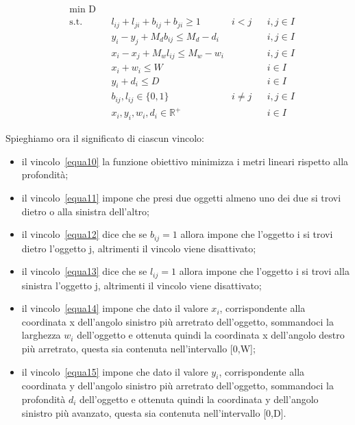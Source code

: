 \begin{align}
	& \underset{}{\text{min D}} \label{equa10}\\
	  & \text{s.t.} &   & l_{ij} + l_{ji} + b_{ij} + b_{ji} \geq 1      & i < j    &   & i,j \in I \label{equa11} \\
	  &             &   & y_i - y_j + M_d b_{ij} \leq M_d - d_i         &          &   & i,j \in I \label{equa12} \\
	  &             &   & x_i - x_j + M_w l_{ij} \leq M_w - w_i         &          &   & i,j \in I \label{equa13} \\
	  &             &   & x_i + w_i \leq W                              &          &   & i \in I   \label{equa14} \\
	  &             &   & y_i + d_i \leq D                              &          &   & i \in I   \label{equa15} \\
	  &             &   & b_{ij}, l_{ij} \in \{0,1\}                    & i \neq j &   & i,j \in I \label{equa16} \\
	  &             &   & x_{i}, y_{i}, w_{i}, d_{i} \in \mathbb{R}^{+} &          &   & i \in I  \label{equa17}  
\end{align}

Spieghiamo ora il significato di ciascun vincolo:
\begin{itemize}
	\item il vincolo~\eqref{equa10} la funzione obiettivo minimizza i metri lineari rispetto alla profondità;
	\item il vincolo~\eqref{equa11} impone che presi due oggetti almeno uno dei due si trovi dietro o alla sinistra dell'altro;
	\item il vincolo~\eqref{equa12} dice che se $b_{ij} = 1$ allora impone che l'oggetto i si trovi dietro l'oggetto j, altrimenti il vincolo viene disattivato;
	\item il vincolo~\eqref{equa13} dice che se $l_{ij} = 1$ allora impone che l'oggetto i si trovi alla sinistra l'oggetto j, altrimenti il vincolo viene disattivato;
	\item il vincolo~\eqref{equa14} impone che dato il valore $x_i$, corrispondente alla coordinata x dell'angolo sinistro più arretrato dell'oggetto, sommandoci la larghezza $w_i$ dell'oggetto e ottenuta quindi la coordinata x dell'angolo destro più arretrato, questa sia contenuta nell'intervallo [0,W];
	\item il vincolo~\eqref{equa15} impone che dato il valore $y_i$, corrispondente alla coordinata y dell'angolo sinistro più arretrato dell'oggetto, sommandoci la profondità $d_i$ dell'oggetto e ottenuta quindi la coordinata y dell'angolo sinistro più avanzato, questa sia contenuta nell'intervallo [0,D].
\end{itemize}

